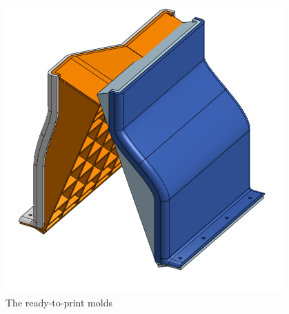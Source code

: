 \begin{figure}[htp]
\centering
\includegraphics[width=0.95\textwidth, angle=0]{Meetings/November/11-27-21/11-22-21_CAD_Figure5 - Nathan Forrer.PNG}
\caption{The ready-to-print molds}
\label{fig:pic5}
\end{figure}




